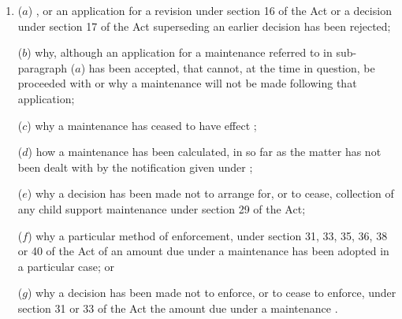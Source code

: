 \documentclass[a4paper,12pt]{article}
\begin{document}
\begin{enumerate}\item[]
($a$) ,   %
or an application for a 
revision under section 16 of the Act or a decision under section 17 of the Act superseding an earlier decision  %
has been rejected;

($b$) why, although an application for a maintenance  referred to in sub-paragraph ($a$) has been accepted, that  cannot, at the time in question, be proceeded with or why a maintenance  will not be made following that application;

($c$) why a maintenance  has ceased to have effect%
;

($d$) how a maintenance  has been calculated, in so far as the matter has not been dealt with by the notification given under 
;  %

($e$) why a decision has been made not to arrange for, or to cease, collection of any child support maintenance under section 29 of the Act;

($f$) why a particular method of enforcement, under section 31, 33, 35, 36, 38 or 40 of the Act of an amount due under a maintenance  has been adopted in a particular case; or

($g$) why a decision has been made not to enforce, or to cease to enforce, under section 31 or 33 of the Act the amount due under a maintenance .
\end{enumerate}
\end{document}
